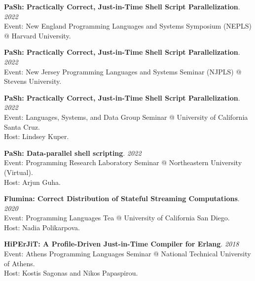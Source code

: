 \begin{minipage}{\textwidth}
\textbf{PaSh: Practically Correct, Just-in-Time Shell Script Parallelization}. \hfill {\em 2022}\\
Event: New England Programming Languages and Systems Symposium (NEPLS) @ Harvard University.
\end{minipage}

\begin{minipage}{\textwidth}
\textbf{PaSh: Practically Correct, Just-in-Time Shell Script Parallelization}. \hfill {\em 2022}\\
Event: New Jersey Programming Languages and Systems Seminar (NJPLS) @ Stevens University.
\end{minipage}

\begin{minipage}{\textwidth}
\textbf{PaSh: Practically Correct, Just-in-Time Shell Script Parallelization}. \hfill {\em 2022}\\
Event: Languages, Systems, and Data Group Seminar @ University of California Santa Cruz.\\
 Host: Lindsey Kuper.
\end{minipage}

\begin{minipage}{\textwidth}
\textbf{PaSh: Data-parallel shell scripting}. \hfill {\em 2022}\\
Event: Programming Research Laboratory Seminar @ Northeastern University (Virtual).\\
 Host: Arjun Guha.
\end{minipage}

\begin{minipage}{\textwidth}
\textbf{Flumina: Correct Distribution of Stateful Streaming Computations}. \hfill {\em 2020}\\
Event: Programming Languages Tea @ University of California San Diego.\\
 Host: Nadia Polikarpova.
\end{minipage}


\begin{minipage}{\textwidth}
\textbf{HiPErJiT: A Profile-Driven Just-in-Time Compiler for Erlang}. \hfill {\em 2018}\\
Event: Athens Programming Languages Seminar @ National Technical University of Athens.\\
 Host: Kostis Sagonas and Nikos Papaspirou.
\end{minipage}


